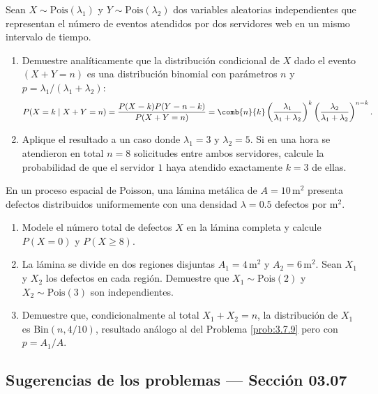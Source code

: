 \begin{problema}
	\label{prob:3.7.9}
	Sean $X \sim \text{Pois}(\lambda_{1})$ y $Y \sim \text{Pois}(\lambda_{2})$ dos variables aleatorias independientes que representan el número de eventos atendidos por dos servidores web en un mismo intervalo de tiempo.
	\begin{enumerate}
		\item Demuestre analíticamente que la distribución condicional de $X$ dado el evento $(X + Y = n)$ es una distribución binomial con parámetros $n$ y $p = \lambda_{1} / (\lambda_{1} + \lambda_{2})$:
		\begin{align*}
			P(X = k \mid X + Y = n) = \dfrac{P(X = k) P(Y = n - k)}{P(X + Y = n)} = \comb{n}{k} \left(\dfrac{\lambda_{1}}{\lambda_{1} + \lambda_{2}}\right)^{k} \left(\dfrac{\lambda_{2}}{\lambda_{1} + \lambda_{2}}\right)^{n-k}.
		\end{align*}
		\item Aplique el resultado a un caso donde $\lambda_{1} = 3$ y $\lambda_{2} = 5$. Si en una hora se atendieron en total $n = 8$ solicitudes entre ambos servidores, calcule la probabilidad de que el servidor $1$ haya atendido exactamente $k = 3$ de ellas.
	\end{enumerate}
\end{problema}

\begin{problema}
	\label{prob:3.7.10}
	En un proceso espacial de Poisson, una lámina metálica de $A = 10\,\text{m}^{2}$ presenta defectos distribuidos uniformemente con una densidad $\lambda = 0.5$ defectos por $\text{m}^{2}$.
	\begin{enumerate}
		\item Modele el número total de defectos $X$ en la lámina completa y calcule $P(X = 0)$ y $P(X \ge 8)$.
		\item La lámina se divide en dos regiones disjuntas $A_{1} = 4\,\text{m}^{2}$ y $A_{2} = 6\,\text{m}^{2}$. Sean $X_{1}$ y $X_{2}$ los defectos en cada región. Demuestre que $X_{1} \sim \text{Pois}(2)$ y $X_{2} \sim \text{Pois}(3)$ son independientes.
		\item Demuestre que, condicionalmente al total $X_{1} + X_{2} = n$, la distribución de $X_{1}$ es $\text{Bin}(n, 4/10)$, resultado análogo al del Problema \ref{prob:3.7.9} pero con $p = A_{1}/A$.
	\end{enumerate}
\end{problema}

\subsection*{Sugerencias de los problemas --- Sección 03.07}

